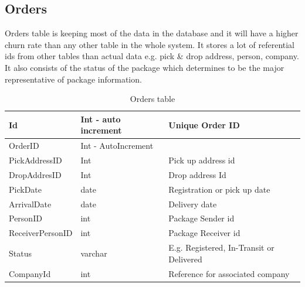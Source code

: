 \subsection{Orders}
Orders table is keeping most of the data in the database and it will have a higher churn rate than any other table in the whole system. It stores a lot of referential ids from other tables than actual data e.g. pick \& drop address, person, company. It also consists of the status of the package which determines to be the major representative of package information.

\begin{table}[!ht]
\begin{center}
\begin{tabular}{ |l|l|l| } 
 \hline
Id & Int - auto increment & Unique Order ID \\
 \hline

OrderID & Int - AutoIncrement  & \\
\hline
PickAddressID & Int & Pick up address id\\
\hline
DropAddresID  & Int  & Drop address Id\\
\hline
PickDate  & date & Registration or pick up date\\
\hline
ArrivalDate & date & Delivery date\\
\hline
PersonID & int & Package Sender id\\
\hline
ReceiverPersonID & int & Package Receiver id\\
\hline
Status & varchar & E.g. Registered, In-Transit or Delivered\\
\hline
CompanyId & int & Reference for associated company\\

 \hline
\end{tabular}
\end{center}
    \caption{Orders table}
\end{table}

